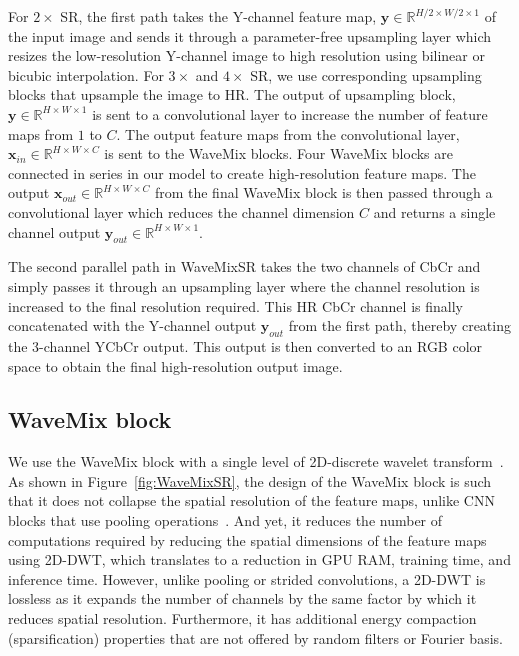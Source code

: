 \documentclass{article}
\begin{document}
For $2\times$ SR, the first path takes the Y-channel feature map, $\textbf{y}\in\mathbb{R}^{H/2\times W/2 \times 1}$ of the input image and sends it through a parameter-free upsampling layer which resizes the low-resolution Y-channel image to high resolution using bilinear or bicubic interpolation. For $3\times $ and $ 4\times$ SR, we use corresponding upsampling blocks that upsample the image to HR. The output of upsampling block, $\textbf{y}\in\mathbb{R}^{H\times W \times 1}$ is sent to a convolutional layer to increase the number of feature maps from $1$ to $C$. The output feature maps from the convolutional layer, $\textbf{x}_{in}\in\mathbb{R}^{H\times W \times C}$ is sent to the WaveMix blocks. Four WaveMix blocks are connected in series in our model to create high-resolution feature maps. The output $\textbf{x}_{out}\in\mathbb{R}^{H\times W \times C}$ from the final WaveMix block is then passed through a convolutional layer which reduces the channel dimension $C$ and returns a single channel output $\textbf{y}_{out}\in\mathbb{R}^{H\times W \times 1}$. 

The second parallel path in WaveMixSR takes the two channels of CbCr and simply passes it through an upsampling layer where the channel resolution is increased to the final resolution required. This HR CbCr channel is finally concatenated with the Y-channel output $\textbf{y}_{out}$ from the first path, thereby creating the 3-channel YCbCr output. This output is then converted to an RGB color space to obtain the final high-resolution output image.


\subsection{WaveMix block}

We use the WaveMix block with a single level of 2D-discrete wavelet transform~\cite{jeevan2023wavemix}. As shown in Figure~\ref{fig:WaveMixSR}, the design of the WaveMix block is such that it does not collapse the spatial resolution of the feature maps, unlike CNN blocks that use pooling operations~\cite{https://doi.org/10.48550/arxiv.1512.03385}. And yet, it reduces the number of computations required by reducing the spatial dimensions of the feature maps using 2D-DWT, which translates to a reduction in GPU RAM, training time, and inference time. However, unlike pooling or strided convolutions, a 2D-DWT is lossless as it expands the number of channels by the same factor by which it reduces spatial resolution. Furthermore, it has additional energy compaction (sparsification) properties that are not offered by random filters or Fourier basis.
\end{document}
